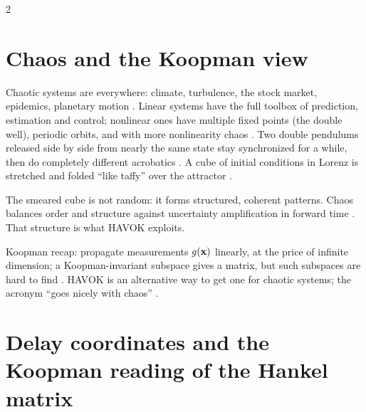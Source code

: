 \begin{paracol}{2}
\section{Chaos and the Koopman view}\label{sec:hv-chaos}

Chaotic systems are everywhere: climate, turbulence, the stock market, epidemics, planetary motion . Linear
systems have the full toolbox of prediction, estimation and control; nonlinear ones have multiple fixed points (the double
well), periodic orbits, and with more nonlinearity chaos . Two double pendulums
released side by side from nearly the same state stay synchronized for a while, then do completely different acrobatics
. A cube of initial conditions in Lorenz is stretched and folded ``like taffy'' over the
attractor .

\begin{intuition}
The smeared cube is not random: it forms structured, coherent patterns. Chaos balances order and structure against
uncertainty amplification in forward time . That structure is what HAVOK
exploits.
\end{intuition}

Koopman recap: propagate measurements $g(\mathbf{x})$ linearly, at the price of infinite dimension; a Koopman-invariant subspace
gives a matrix, but such subspaces are hard to find . HAVOK is an
alternative way to get one for chaotic systems; the acronym ``goes nicely with chaos'' .

\section{Delay coordinates and the Koopman reading of the Hankel matrix}\label{sec:hv-hankel}


\end{paracol}
